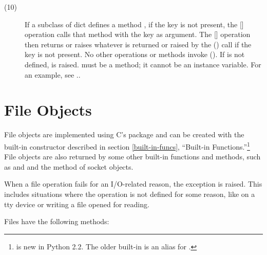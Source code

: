 \begin{description}
\item[(10)] If a subclass of dict defines a method ,
if the key  is not present, the [] operation calls
that method with the key  as argument.  The []
operation then returns or raises whatever is returned or raised by the
() call if the key is not present.
No other operations or methods invoke ().
If  is not defined,  is raised.
 must be a method; it cannot be an instance variable.
For an example, see ..

\end{description}

\section{File Objects
            \label{bltin-file-objects}}

File objects are implemented using C's 
package and can be created with the built-in constructor
 described in section
\ref{built-in-funcs}, ``Built-in Functions.''\footnote{
is new in Python 2.2.  The older built-in  is an
alias for .}  File objects are also returned
by some other built-in functions and methods, such as
 and  and the
 method of socket objects.

When a file operation fails for an I/O-related reason, the exception
 is raised.  This includes situations where the
operation is not defined for some reason, like  on a tty
device or writing a file opened for reading.

Files have the following methods:


